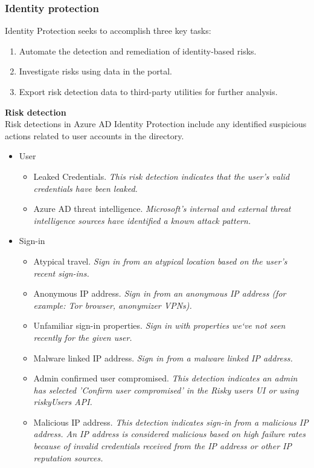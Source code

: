 \subsubsection{Identity protection}
Identity Protection seeks to accomplish three key tasks:
\begin{enumerate}
\item Automate the detection and remediation of identity-based risks.
\item Investigate risks using data in the portal.
\item Export risk detection data to third-party utilities for further analysis.
\end{enumerate}

\textbf{Risk detection} \\
Risk detections in Azure AD Identity Protection include any identified suspicious actions related to user accounts in the directory.
\begin{itemize}
\item User
	\begin{itemize}
	\item Leaked Credentials. \textit{This risk detection indicates that the user's valid credentials have been leaked.}
	\item Azure AD threat intelligence. \textit{Microsoft’s internal and external threat intelligence sources have identified a known attack pattern.}
	\end{itemize}
\item Sign-in
	\begin{itemize}
	\item Atypical travel. \textit{Sign in from an atypical location based on the user’s recent sign-ins.}
	\item Anonymous IP address. \textit{Sign in from an anonymous IP address (for example: Tor browser, anonymizer VPNs).}
	\item Unfamiliar sign-in properties. \textit{Sign in with properties we‘ve not seen recently for the given user.}
	\item Malware linked IP address. \textit{Sign in from a malware linked IP address.}
	\item Admin confirmed user compromised. \textit{This detection indicates an admin has selected 'Confirm user compromised' in the Risky users UI or using riskyUsers API.}
	\item Malicious IP address. \textit{This detection indicates sign-in from a malicious IP address. An IP address is considered malicious based on high failure rates because of invalid credentials received from the IP address or other IP reputation sources.}
	\end{itemize}
\end{itemize}


